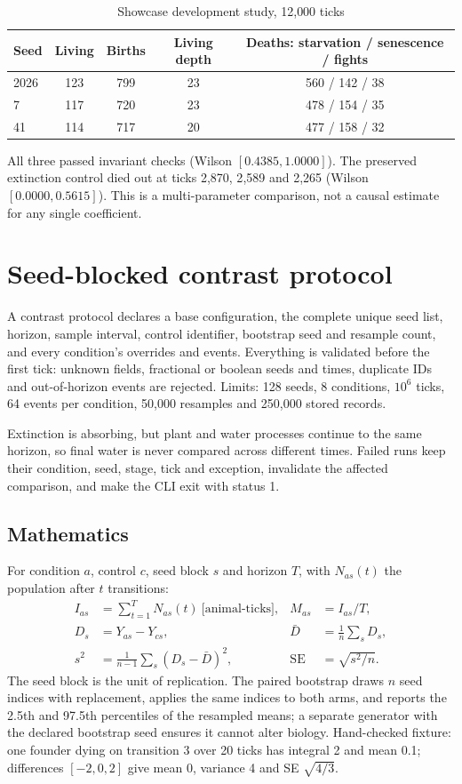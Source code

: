 \begin{table}[htbp]
\centering
\caption{Showcase development study, 12{,}000 ticks}
\begin{tabular}{lccccc}
\toprule
Seed & Living & Births & Living depth & \multicolumn{2}{c}{Deaths: starvation / senescence / fights} \\
\midrule
2026 & 123 & 799 & 23 & \multicolumn{2}{c}{560 / 142 / 38} \\
7 & 117 & 720 & 23 & \multicolumn{2}{c}{478 / 154 / 35} \\
41 & 114 & 717 & 20 & \multicolumn{2}{c}{477 / 158 / 32} \\
\bottomrule
\end{tabular}
\end{table}
All three passed invariant checks (Wilson $[0.4385,1.0000]$). The preserved
extinction control died out at ticks 2{,}870, 2{,}589 and 2{,}265 (Wilson
$[0.0000,0.5615]$). This is a multi-parameter comparison, not a causal estimate for
any single coefficient.

\section{Seed-blocked contrast protocol}
A contrast protocol declares a base configuration, the complete unique seed list,
horizon, sample interval, control identifier, bootstrap seed and resample count,
and every condition's overrides and events. Everything is validated before the
first tick: unknown fields, fractional or boolean seeds and times, duplicate IDs and
out-of-horizon events are rejected. Limits: 128 seeds, 8 conditions, $10^6$ ticks,
64 events per condition, 50{,}000 resamples and 250{,}000 stored records.

Extinction is absorbing, but plant and water processes continue to the same
horizon, so final water is never compared across different times. Failed runs keep
their condition, seed, stage, tick and exception, invalidate the affected
comparison, and make the CLI exit with status 1.

\subsection{Mathematics}
For condition $a$, control $c$, seed block $s$ and horizon $T$, with $N_{as}(t)$
the population after $t$ transitions:
\begin{align*}
I_{as}&=\textstyle\sum_{t=1}^{T}N_{as}(t)\ \text{[animal-ticks]}, &
M_{as}&=I_{as}/T,\\
D_s&=Y_{as}-Y_{cs}, &
\bar D&=\tfrac1n\textstyle\sum_s D_s,\\
s^2&=\tfrac{1}{n-1}\textstyle\sum_s(D_s-\bar D)^2, &
\mathrm{SE}&=\sqrt{s^2/n}.
\end{align*}
The seed block is the unit of replication. The paired bootstrap draws $n$ seed
indices with replacement, applies the same indices to both arms, and reports the
2.5th and 97.5th percentiles of the resampled means; a separate generator with the
declared bootstrap seed ensures it cannot alter biology. Hand-checked fixture: one
founder dying on transition 3 over 20 ticks has integral 2 and mean 0.1;
differences $[-2,0,2]$ give mean 0, variance 4 and SE $\sqrt{4/3}$.

